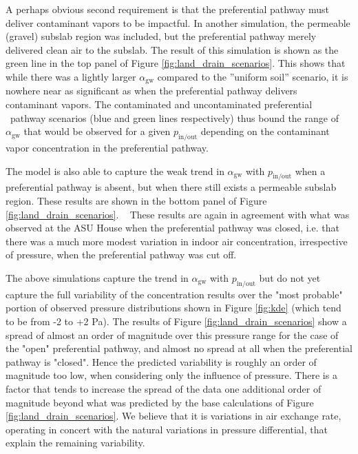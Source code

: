\documentclass[preprint,12pt]{elsarticle}
\begin{document}
A perhaps obvious second requirement is that the preferential pathway must deliver contaminant vapors to be impactful.
In another simulation, the permeable (gravel) subslab region was included, but the preferential pathway merely delivered clean air to the subslab.
The result of this simulation is shown as the green line in the top panel of Figure \ref{fig:land_drain_scenarios}.
This shows that while there was a lightly larger $\alpha_\mathrm{gw}$ compared to the ”uniform soil” scenario, it is nowhere near as significant as when the preferential pathway delivers contaminant vapors.
The contaminated and uncontaminated preferential  pathway scenarios (blue and green lines respectively) thus bound the range of $\alpha_\mathrm{gw}$ that would be observed for a given $p_\mathrm{in/out}$ depending on the contaminant vapor concentration in the preferential pathway.\par

The model is also able to capture the weak trend in $\alpha_\mathrm{gw}$ with $p_\mathrm{in/out}$ when a preferential pathway is absent, but when there still exists a permeable subslab region.
These results are shown in the bottom panel of Figure \ref{fig:land_drain_scenarios}.  
These results are again in agreement with what was observed at the ASU House when the preferential pathway was closed, i.e. that there was a much more modest variation in indoor air concentration, irrespective of pressure, when the preferential pathway was cut off.\par

The above simulations capture the trend in $\alpha_\mathrm{gw}$ with $p_\mathrm{in/out}$ but do not yet capture the full variability of the concentration results over the "most probable" portion of observed pressure distributions shown in Figure \ref{fig:kde} (which tend to be from -2 to +2 Pa).
The results of Figure \ref{fig:land_drain_scenarios} show a spread of almost an order of magnitude over this pressure range for the case of the "open" preferential pathway, and almost no spread at all when the preferential pathway is "closed".
Hence the predicted variability is roughly an order of magnitude too low, when considering only the influence of pressure.
There is a factor that tends to increase the spread of the data one additional order of magnitude beyond what was predicted by the base calculations of Figure \ref{fig:land_drain_scenarios}.
We believe that it is variations in air exchange rate, operating in concert with the natural variations in pressure differential, that explain the remaining variability.\par
\end{document}
